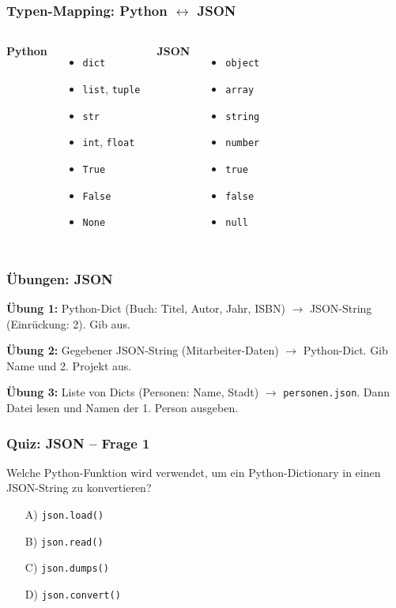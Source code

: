 \documentclass[aspectratio=169]{beamer} %
\begin{document}
\begin{frame}[fragile]
\frametitle{Typen-Mapping: Python $\leftrightarrow$ JSON}
\begin{columns}[T]
    \textbf{Python}
    \begin{itemize}
        \item \texttt{dict}
        \item \texttt{list}, \texttt{tuple}
        \item \texttt{str}
        \item \texttt{int}, \texttt{float}
        \item \texttt{True}
        \item \texttt{False}
        \item \texttt{None}
    \end{itemize}
    \textbf{JSON}
    \begin{itemize}
        \item \texttt{object}
        \item \texttt{array}
        \item \texttt{string}
        \item \texttt{number}
        \item \texttt{true}
        \item \texttt{false}
        \item \texttt{null}
    \end{itemize}
\end{columns}
\end{frame}

\begin{frame}[fragile]
\frametitle{Übungen: JSON}
\textbf{Übung 1:}
Python-Dict (Buch: Titel, Autor, Jahr, ISBN) $\rightarrow$ JSON-String (Einrückung: 2). Gib aus.
\vspace{0.5em}

\textbf{Übung 2:}
Gegebener JSON-String (Mitarbeiter-Daten) $\rightarrow$ Python-Dict. Gib Name und 2. Projekt aus.
\vspace{0.5em}

\textbf{Übung 3:}
Liste von Dicts (Personen: Name, Stadt) $\rightarrow$ \texttt{personen.json}. Dann Datei lesen und Namen der 1. Person ausgeben.
\end{frame}

\begin{frame}[fragile]
\frametitle{Quiz: JSON – Frage 1}
Welche Python-Funktion wird verwendet, um ein Python-Dictionary in einen JSON-String zu konvertieren?
\begin{enumerate}
    \item[A)] \texttt{json.load()}
    \item[B)] \texttt{json.read()}
    \item[C)] \texttt{json.dumps()}
    \item[D)] \texttt{json.convert()}
\end{enumerate}
\end{frame}
\end{document}
